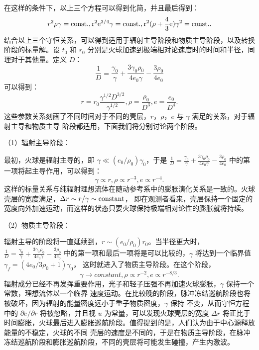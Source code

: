 	在这样的条件下，以上三个方程可以得到化简，并且最后得到：
	\begin{equation}
	r^{2}\rho\gamma=\rm{const.}, r^{2}e^{3/4}\gamma=\rm{const.}, r^{2}(\rho+\frac{4}{3}e)\gamma^{2}=\rm{const.}.
	\end{equation}
	结合以上三个守恒关系，可以得到适用于辐射主导阶段和物质主导阶段，以及转换阶段的标量解。设 $t_{0}$ 和 $r_{0}$
	分别是火球加速到极端相对论速度时的时间和半径，同理对于其他量。定义 $D$：
	\begin{equation}
	\frac{1}{D}=\frac{\gamma_{0}}{\gamma}+\frac{3\gamma_{0}\rho_{0}}{4e_{0}\gamma}-\frac{3\rho_{0}}{4e_{0}}
	\end{equation}
	可以得到：
	\begin{equation}
	r=r_{0}\frac{\gamma^{1/2}D^{3/2}}{\gamma^{1/2}}, \rho=\frac{\rho_{0}}{D^{3}}, e=\frac{e_{0}}{D^{4}}.
	\end{equation}
	这些参数关系刻画了不同时间对于不同的壳层，$r$，$\rho$，$e$ 与 $\gamma$ 满足的关系，对于辐射主导和物质主导
	阶段都适用，下面我们将分别讨论两个阶段。

	（1）辐射主导阶段：

	最初，火球是辐射主导的，即 $\gamma\ll(e_{0}/\rho_{0})\gamma_{0}$，于是  $\frac{1}{D}=\frac{\gamma_{0}}{\gamma}+\frac{3\gamma_{0}\rho_{0}}{4e_{0}\gamma}-\frac{3\rho_{0}}{4e_{0}}$
	中的第一项将起主导作用，可以得到：
	\begin{equation}
	\gamma\propto r, \rho\propto r^{-3}, e\propto r^{-4}.
	\end{equation}
	这样的标量关系与纯辐射理想流体在随动参考系中的膨胀演化关系是一致的。火球壳层的宽度满足，$\Delta r\sim r/\gamma\sim \rm{constant}$，
	即在观测者看来，壳层保持一个固定的宽度向外加速运动，而这样的状态只要火球保持极端相对论性的膨胀就将持续。

	（2）物质主导阶段：

	辐射主导的阶段将一直延续到，$r\sim(e_{0}/\rho_{0})r_{0}$。当半径更大时，
	$\frac{1}{D}=\frac{\gamma_{0}}{\gamma}+\frac{3\gamma_{0}\rho_{0}}{4e_{0}\gamma}-\frac{3\rho_{0}}{4e_{0}}$
	中的第一项和最后一项将是可以比较的，$\gamma$ 将达到一个临界值 $\gamma_{f}=(4e_{0}/3\rho_{0}+1)\gamma_{0}$，
	这时就进入了物质主导阶段。在这个阶段，
	\begin{equation}
	\gamma\rightarrow constant, \rho\propto r^{-2}, e\propto r^{-8/3}.
	\end{equation}
	辐射成分已经不再发挥重要作用，光子和轻子压强不再加速火球膨胀，$\gamma$ 保持一个常数，理想流体以一个临界
	速度运动。在比较晚的阶段，脉冲冻结巡航阶段也将被破坏，因为辐射的能量密度远小于重子物质密度，$\gamma$ 保持
	不变，从而守恒方程中的 $\partial e/\partial r$ 将被忽略，并且视 $u$ 为常量，可以发现火球壳层的宽度 $\Delta r$
	将正比于时间膨胀，火球最后进入膨胀巡航阶段。值得提到的是，人们认为由于中心源释放能量的不稳定，火球的不同
	壳层的速度是不同的，于是在物质主导阶段，在脉冲冻结巡航阶段和膨胀巡航阶段，不同的壳层将可能发生碰撞，产生内激波。

